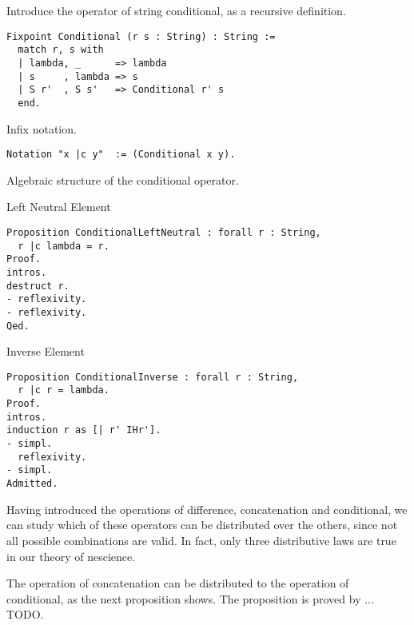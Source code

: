 {\color{red} Introduce the operator of string conditional, as a recursive definition.}

\begin{sourcecode}
{\scriptsize \begin{verbatim}
Fixpoint Conditional (r s : String) : String :=
  match r, s with
  | lambda, _      => lambda
  | s     , lambda => s
  | S r'  , S s'   => Conditional r' s
  end.
\end{verbatim}}
\end{sourcecode}

{\color{red} Infix notation.}

\begin{sourcecode}
{\scriptsize \begin{verbatim}
Notation "x |c y"  := (Conditional x y).
\end{verbatim}}
\end{sourcecode}

{\color{red} Algebraic structure of the conditional operator.}

{\color{red} Left Neutral Element}

\begin{sourcecode}
{\scriptsize \begin{verbatim}
Proposition ConditionalLeftNeutral : forall r : String,
  r |c lambda = r.
Proof.
intros.
destruct r.
- reflexivity.
- reflexivity.
Qed.
\end{verbatim}}
\end{sourcecode}

{\color{red} Inverse Element}

\begin{sourcecode}
{\scriptsize \begin{verbatim}
Proposition ConditionalInverse : forall r : String,
  r |c r = lambda.
Proof.
intros.
induction r as [| r' IHr'].
- simpl.
  reflexivity.
- simpl.
Admitted.
\end{verbatim}}
\end{sourcecode}

Having introduced the operations of difference, concatenation and conditional, we can study which of these operators can be distributed over the others, since not all possible combinations are valid. In fact, only three distributive laws are true in our theory of nescience.

The operation of concatenation can be distributed to the operation of conditional, as the next proposition shows. The proposition is proved by ... {\color{red} TODO}.

